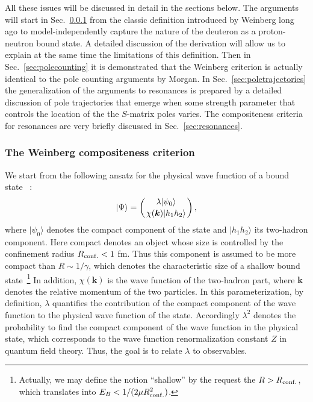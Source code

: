  

All these issues will be discussed in detail in the sections below. The
arguments will start in Sec.~\ref{sec:weinberg} from the classic definition
introduced by Weinberg long ago to model-independently capture  the nature of
the deuteron as a proton-neutron bound state. A detailed discussion of the
derivation will allow us to explain at the same time the limitations of this
definition.
Then in Sec.~\ref{sec:polecounting} it is demonstrated that the Weinberg
criterion is actually identical to the pole counting arguments by Morgan.
In Sec.~\ref{sec:poletrajectories} the generalization of the arguments to
resonances is prepared by a detailed discussion of pole trajectories that emerge
when some strength parameter that controls the location of the the $S$-matrix
poles varies. The compositeness criteria for resonances are very briefly
discussed in Sec.~\ref{sec:resonances}.

 \subsubsection{The Weinberg compositeness criterion}
 \label{sec:weinberg}

We start from the following ansatz for the physical wave function of a bound
state~\cite{Weinberg:1965zz} :
 \begin{equation}
|\Psi \rangle = \left(\lambda|\psi_0\rangle\atop
\chi (\bm{k}) |h_1h_2 \rangle \right),
\end{equation}
 where $|\psi_0\rangle$ denotes the compact component of the state and  $|h_1h_2
 \rangle$ its two-hadron component.
  Here compact denotes an object whose size is controlled by the
  confinement radius $R_{\rm conf.}< 1$ fm. Thus this component is assumed to be more
  compact than $R\sim 1/\gamma$, which denotes the characteristic size of a shallow bound
  state~\footnote{Actually, we may define the notion ``shallow'' by the request
  the $R>R_{\rm conf.}$, which translates into $E_B<1/(2\mu R_{\rm conf.}^2)$.}
  In addition, $\chi (\bm{k})$ is the wave
 function of the two-hadron part, where $\bm{k}$ denotes the relative 
 momentum of the two particles. 
 In this parameterization, by definition, $\lambda$ quantifies the contribution 
 of the compact component of the wave function to the physical wave function of 
 the state. Accordingly $\lambda^2$ denotes the probability to find the
 compact component of the wave function in the physical state, which
 corresponds to the wave function renormalization constant $Z$ in quantum field
 theory. Thus, the goal is to relate $\lambda$ to observables.

